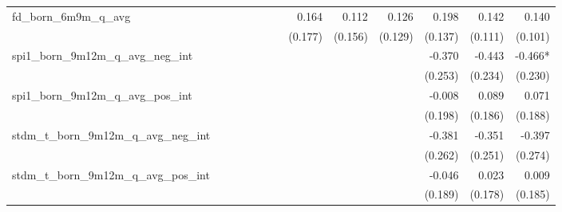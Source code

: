 \begin{tabular}{lrrrrrrrrrrrr}
fd\_born\_6m9m\_q\_avg                      &              &              &              &              &              &              &        0.164 &        0.112 &        0.126 &        0.198 &        0.142 &        0.140 \\ 
                                            &              &              &              &              &              &              &      (0.177) &      (0.156) &      (0.129) &      (0.137) &      (0.111) &      (0.101) \\ 
spi1\_born\_9m12m\_q\_avg\_neg\_int         &              &              &              &              &              &              &              &              &              &       -0.370 &       -0.443 &      -0.466* \\ 
                                            &              &              &              &              &              &              &              &              &              &      (0.253) &      (0.234) &      (0.230) \\ 
spi1\_born\_9m12m\_q\_avg\_pos\_int         &              &              &              &              &              &              &              &              &              &       -0.008 &        0.089 &        0.071 \\ 
                                            &              &              &              &              &              &              &              &              &              &      (0.198) &      (0.186) &      (0.188) \\ 
stdm\_t\_born\_9m12m\_q\_avg\_neg\_int      &              &              &              &              &              &              &              &              &              &       -0.381 &       -0.351 &       -0.397 \\ 
                                            &              &              &              &              &              &              &              &              &              &      (0.262) &      (0.251) &      (0.274) \\ 
stdm\_t\_born\_9m12m\_q\_avg\_pos\_int      &              &              &              &              &              &              &              &              &              &       -0.046 &        0.023 &        0.009 \\ 
                                            &              &              &              &              &              &              &              &              &              &      (0.189) &      (0.178) &      (0.185) \\ 

\end{tabular}
